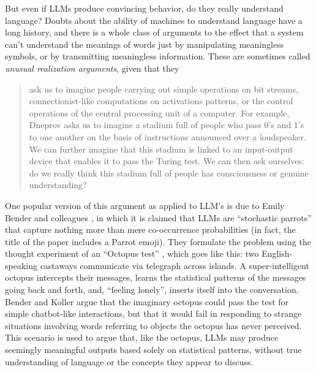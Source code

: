 But even if LLMs produce convincing behavior, do they really understand language? Doubts about the ability of machines to understand language have a long history, and there is a whole class of arguments to the effect that a system can’t understand the meanings of words just by manipulating meaningless symbols, or by transmitting meaningless information. These are sometimes called \emph{unusual realization arguments}, given that they
\begin{quote}
ask us to imagine people carrying out simple operations on bit streams, connectionist-like computations on activations patterns, or the control operations of the central processing unit of a computer. For example, Dneprov asks us to imagine a stadium full of people who pass 0’s and 1’s to one another on the basis of instructions announced over a loudspeaker. We can further imagine that this stadium is linked to an input-output device that enables it to pass the Turing test. We can then ask ourselves: do we really think this stadium full of people has consciousness or genuine understanding? \cite{noelle2022artificial}
\end{quote}

 One popular version of this argument as applied to LLM's is due to Emily Bender and colleagues \cite{bender2021dangers}, in which it is claimed that LLMs are ``stochastic parrots'' that capture nothing more than mere co-occurrence probabilities (in fact, the title of the paper includes a Parrot emoji). They formulate the problem using the thought experiment of an ``Octopus test'' \cite{bender2020climbing}, which goes like this: two English-speaking castaways communicate via telegraph across islands. A super-intelligent octopus intercepts their messages, learns the statistical patterns of the messages going back and forth, and, ``feeling lonely'', inserts itself into the conversation. Bender and Koller argue that the imaginary octopus could pass the test for simple chatbot-like interactions, but that it would fail in responding to strange situations involving words referring to objects the octopus has never perceived. This scenario is used to argue that, like the octopus, LLMs may produce seemingly meaningful outputs based solely on statistical patterns, without true understanding of language or the concepts they appear to discuss.


